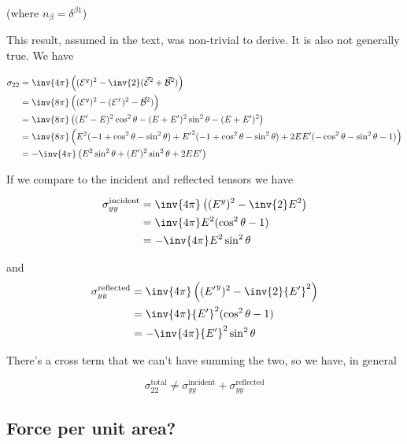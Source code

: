 (where $n_\beta = \delta^{\beta 1}$)

This result, assumed in the text, was non-trivial to derive.  It is also not generally true.  We have 

\begin{align*}
\sigma_{2 2} 
&= \inv{4 \pi} \left( (\mathcal{E}^y)^2 - \inv{2} ( \vec{\mathcal{E}}^2 + \vec{\mathcal{B}}^2 ) \right) \\
&= \inv{8 \pi} \left( (\mathcal{E}^y)^2 - (\mathcal{E}^x)^2 - \vec{\mathcal{B}}^2 ) \right) \\
&= \inv{8 \pi} \left( 
(E' - E)^2 \cos^2\theta - (E + E')^2 \sin^2\theta - (E + E')^2
\right) \\
&= \inv{8 \pi} \left( 
E^2 ( -1 + \cos^2 \theta - \sin^2\theta )
+{E'}^2 ( -1 + \cos^2 \theta - \sin^2\theta )
+ 2 E E' ( -\cos^2\theta - \sin^2\theta -1 ) \right) \\
&= -\inv{4 \pi} \left( E^2 \sin^2 \theta + (E')^2 \sin^2 \theta + 2 E E' \right)
\end{align*}

If we compare to the incident and reflected tensors we have

\begin{align*}
\sigma_{y y}^{\text{incident}} 
&= \inv{4 \pi} \left( (E^y)^2 -\inv{2} E^2 \right) \\
&= \inv{4 \pi} E^2 ( \cos^2\theta - 1 ) \\
&= -\inv{4 \pi} E^2 \sin^2\theta 
\end{align*}

and
\begin{align*}
\sigma_{y y}^{\text{reflected}} 
&= \inv{4 \pi} \left( ({E'}^y)^2 -\inv{2} {E'}^2 \right) \\
&= \inv{4 \pi} {E'}^2 ( \cos^2\theta - 1 ) \\
&= -\inv{4 \pi} {E'}^2 \sin^2\theta 
\end{align*}

There's a cross term that we can't have summing the two, so we have, in general

\begin{equation}\label{eqn:relativisticElectrodynamicsT9:660}
\sigma_{2 2}^{\text{total}} \ne 
\sigma_{y y}^{\text{incident}} 
+\sigma_{y y}^{\text{reflected}} 
\end{equation}

\subsection{Force per unit area?}


